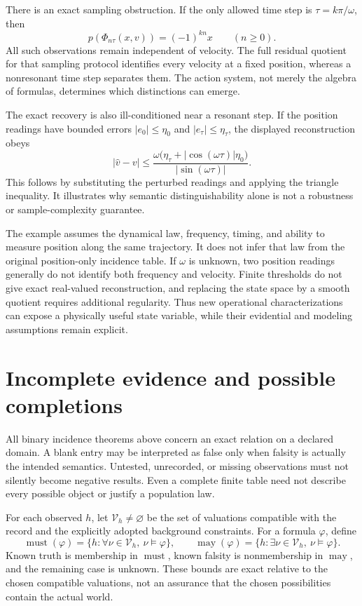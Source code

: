 \documentclass[11pt]{article}
\theoremstyle{definition}
\begin{document}
There is an exact sampling obstruction. If the only allowed time step is
$\tau=k\pi/\omega$, then
\[
 p(\Phi_{n\tau}(x,v))=(-1)^{kn}x
 \qquad(n\ge0).
\]
All such observations remain independent of velocity. The full residual
quotient for that sampling protocol identifies every velocity at a fixed
position, whereas a nonresonant time step separates them. The action system,
not merely the algebra of formulas, determines which distinctions can emerge.

The exact recovery is also ill-conditioned near a resonant step. If the
position readings have bounded errors $|e_0|\le\eta_0$ and
$|e_\tau|\le\eta_\tau$, the displayed reconstruction obeys
\[
 |\widehat v-v|
 \le\frac{\omega\bigl(\eta_\tau+
               |\cos(\omega\tau)|\eta_0\bigr)}
              {|\sin(\omega\tau)|}.
\]
This follows by substituting the perturbed readings and applying the
triangle inequality. It illustrates why semantic distinguishability alone
is not a robustness or sample-complexity guarantee.

The example assumes the dynamical law, frequency, timing, and ability to
measure position along the same trajectory. It does not infer that law
from the original position-only incidence table. If $\omega$ is unknown,
two position readings generally do not identify both frequency and velocity.
Finite thresholds do not give exact real-valued reconstruction, and replacing
the state space by a smooth quotient requires additional regularity. Thus
new operational characterizations can expose a physically useful state
variable, while their evidential and modeling assumptions remain explicit.

\section{Incomplete evidence and possible completions}
\label{sec:evidence}

All binary incidence theorems above concern an exact relation on a declared
domain. A blank entry may be interpreted as false only when falsity is
actually the intended semantics. Untested, unrecorded, or missing observations
must not silently become negative results. Even a complete finite table
need not describe every possible object or justify a population law.

For each observed $h$, let $\mathcal V_h\ne\varnothing$ be the set of
valuations compatible with the record and the explicitly adopted background
constraints. For a formula $\varphi$, define
\[
 \operatorname{must}(\varphi)
 =\{h:\forall\nu\in\mathcal V_h,\ \nu\models\varphi\},
 \qquad
 \operatorname{may}(\varphi)
 =\{h:\exists\nu\in\mathcal V_h,\ \nu\models\varphi\}.
\]
Known truth is membership in $\operatorname{must}$, known falsity is
nonmembership in $\operatorname{may}$, and the remaining case is unknown.
These bounds are exact relative to the chosen compatible valuations, not
an assurance that the chosen possibilities contain the actual world.
\end{document}
